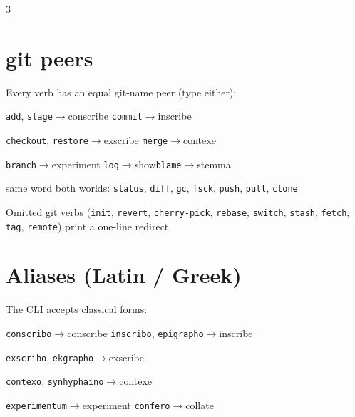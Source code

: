 \documentclass[9pt]{extarticle}
\newcommand{\ci}[1]{\texttt{#1}}                       %
\begin{document}
\begin{multicols}{3}
\section{git peers}
Every verb has an equal git-name peer (type either):
\begin{description}[leftmargin=1em,labelsep=0.4em,font=\normalfont]
\item[$\cdot$] \ci{add}, \ci{stage}$\to$conscribe\quad
\ci{commit}$\to$inscribe
\item[$\cdot$] \ci{checkout}, \ci{restore}$\to$exscribe\quad
\ci{merge}$\to$contexe
\item[$\cdot$] \ci{branch}$\to$experiment\quad
\ci{log}$\to$show\quad\ci{blame}$\to$stemma
\item[$\cdot$] same word both worlds: \ci{status}, \ci{diff},
\ci{gc}, \ci{fsck}, \ci{push}, \ci{pull}, \ci{clone}
\end{description}
Omitted git verbs (\ci{init}, \ci{revert}, \ci{cherry-pick},
\ci{rebase}, \ci{switch}, \ci{stash}, \ci{fetch}, \ci{tag},
\ci{remote}) print a one-line redirect.

\section{Aliases (Latin / Greek)}
The CLI accepts classical forms:
\begin{description}[leftmargin=1em,labelsep=0.4em,font=\normalfont]
\item[$\cdot$] \ci{conscribo}$\to$conscribe\quad
\ci{inscribo}, \ci{epigrapho}$\to$inscribe
\item[$\cdot$] \ci{exscribo}, \ci{ekgrapho}$\to$exscribe
\item[$\cdot$] \ci{contexo}, \ci{synhyphaino}$\to$contexe
\item[$\cdot$] \ci{experimentum}$\to$experiment\quad
\ci{confero}$\to$collate
\end{description}


\end{multicols}
\end{document}
